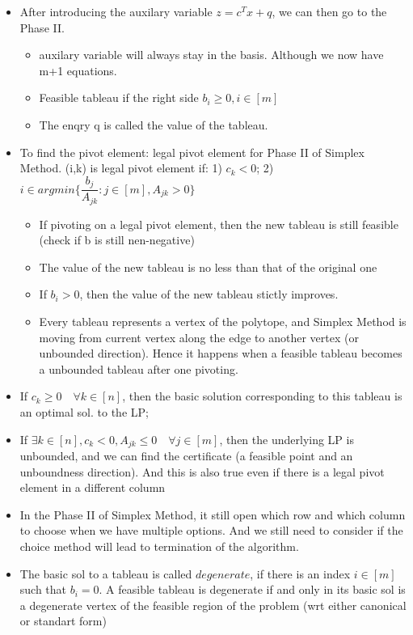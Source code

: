 \documentclass{article}
\begin{document}
\begin{itemize}
\begin{itemize}
\end{itemize}
\item After introducing the auxilary variable $z = c^Tx+q$, we can then go to the Phase II.
\begin{itemize}
\item auxilary variable will always stay in the basis. Although we now have m+1 equations.
\item Feasible tableau if the right side $b_i\geq 0, i\in [m]$
\item The enqry q is called the value of the tableau.
\end{itemize}
\item To find the pivot element: legal pivot element for Phase II of Simplex Method. (i,k) is legal pivot element if: 1) $c_k<0$; 2) $i\in argmin\{\dfrac{b_j}{A_{jk}}:j\in [m], A_{jk}>0\}$
\begin{itemize}
\item If pivoting on a legal pivot element, then the new tableau is still feasible (check if b is still nen-negative)
\item The value of the new tableau is no less than that of the original one
\item If $b_i>0$, then the value of the new tableau stictly improves.
\item Every tableau represents a vertex of the polytope, and Simplex Method is moving from current vertex along the edge to another vertex (or unbounded direction). Hence it happens when a feasible tableau becomes a unbounded tableau after one pivoting.
\end{itemize}
\item If $c_k\geq 0 \quad \forall k\in [n]$, then the basic solution corresponding to this tableau is an optimal sol. to the LP;
\item If $\exists k\in [n], c_k<0, A_{jk}\leq 0 \quad \forall j\in [m]$, then the underlying LP is unbounded, and we can find the certificate (a feasible point and an unboundness direction). And this is also true even if there is a legal pivot element in a different column
\item In the Phase II of Simplex Method, it still open which row and which column to choose when we have multiple options. And we still need to consider if the choice method will lead to termination of the algorithm.
\item The basic sol to a tableau is called $degenerate$, if there is an index $i\in [m]$ such that $b_i=0$. A feasible tableau is degenerate if and only in its basic sol is a degenerate vertex of the feasible region of the problem (wrt either canonical or standart form)

\end{itemize}
\end{document}
